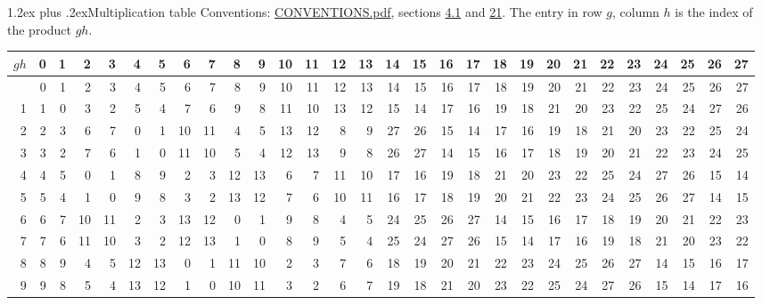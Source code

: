 \documentclass[10pt,a4paper]{article}
\makeatletter
\renewcommand\section{\@startsection{section}{1}{\z@}{-3ex plus -1ex minus -.2ex}%
  {1.2ex plus .2ex}{\normalfont\large\sffamily\bfseries\color{parttitle}}}
\numberwithin{equation}{section}
\makeatother
\begin{document}
\section{Multiplication table}\label{s:multiplication}
Conventions: \href{../../CONVENTIONS.pdf}{CONVENTIONS.pdf}, sections \href{../../../rotation/CONVENTIONS.pdf\#conv.4.1}{4.1} and \href{../../CONVENTIONS.pdf\#conv.21}{21}.
The entry in row $g$, column $h$ is the index of the product $gh$.
{\normalsize\setlength{\tabcolsep}{0.1em}\setlength{\LTleft}{-8pt plus 1fill}\setlength{\LTright}{-8pt plus 1fill}\begin{longtable}{@{}r|rrrrrrrrrrrrrrrrrrrrrrrrrrrr@{}}\toprule
$gh$ & 0 & 1 & 2 & 3 & 4 & 5 & 6 & 7 & 8 & 9 & 10 & 11 & 12 & 13 & 14 & 15 & 16 & 17 & 18 & 19 & 20 & 21 & 22 & 23 & 24 & 25 & 26 & 27\\\midrule\endhead
\bottomrule\endfoot\endlastfoot
0 & 0 & 1 & 2 & 3 & 4 & 5 & 6 & 7 & 8 & 9 & 10 & 11 & 12 & 13 & 14 & 15 & 16 & 17 & 18 & 19 & 20 & 21 & 22 & 23 & 24 & 25 & 26 & 27\\*
1 & 1 & 0 & 3 & 2 & 5 & 4 & 7 & 6 & 9 & 8 & 11 & 10 & 13 & 12 & 15 & 14 & 17 & 16 & 19 & 18 & 21 & 20 & 23 & 22 & 25 & 24 & 27 & 26\\
2 & 2 & 3 & 6 & 7 & 0 & 1 & 10 & 11 & 4 & 5 & 13 & 12 & 8 & 9 & 27 & 26 & 15 & 14 & 17 & 16 & 19 & 18 & 21 & 20 & 23 & 22 & 25 & 24\\
3 & 3 & 2 & 7 & 6 & 1 & 0 & 11 & 10 & 5 & 4 & 12 & 13 & 9 & 8 & 26 & 27 & 14 & 15 & 16 & 17 & 18 & 19 & 20 & 21 & 22 & 23 & 24 & 25\\
4 & 4 & 5 & 0 & 1 & 8 & 9 & 2 & 3 & 12 & 13 & 6 & 7 & 11 & 10 & 17 & 16 & 19 & 18 & 21 & 20 & 23 & 22 & 25 & 24 & 27 & 26 & 15 & 14\\
5 & 5 & 4 & 1 & 0 & 9 & 8 & 3 & 2 & 13 & 12 & 7 & 6 & 10 & 11 & 16 & 17 & 18 & 19 & 20 & 21 & 22 & 23 & 24 & 25 & 26 & 27 & 14 & 15\\
6 & 6 & 7 & 10 & 11 & 2 & 3 & 13 & 12 & 0 & 1 & 9 & 8 & 4 & 5 & 24 & 25 & 26 & 27 & 14 & 15 & 16 & 17 & 18 & 19 & 20 & 21 & 22 & 23\\
7 & 7 & 6 & 11 & 10 & 3 & 2 & 12 & 13 & 1 & 0 & 8 & 9 & 5 & 4 & 25 & 24 & 27 & 26 & 15 & 14 & 17 & 16 & 19 & 18 & 21 & 20 & 23 & 22\\
8 & 8 & 9 & 4 & 5 & 12 & 13 & 0 & 1 & 11 & 10 & 2 & 3 & 7 & 6 & 18 & 19 & 20 & 21 & 22 & 23 & 24 & 25 & 26 & 27 & 14 & 15 & 16 & 17\\
9 & 9 & 8 & 5 & 4 & 13 & 12 & 1 & 0 & 10 & 11 & 3 & 2 & 6 & 7 & 19 & 18 & 21 & 20 & 23 & 22 & 25 & 24 & 27 & 26 & 15 & 14 & 17 & 16\\

\end{longtable}}
\end{document}
